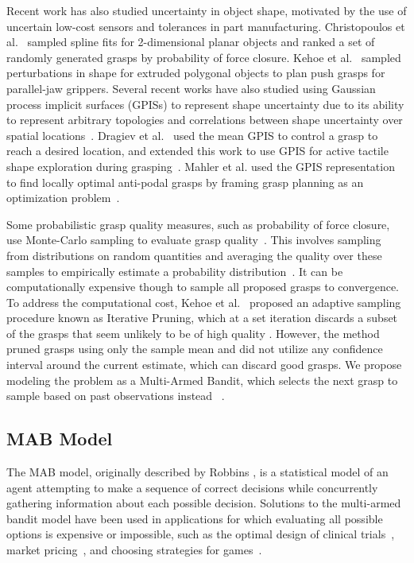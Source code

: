 \documentclass[10pt, conference]{ieeeconf}      %
\begin{document}
Recent work has also studied uncertainty in object shape, motivated by the use of uncertain low-cost sensors and tolerances in part manufacturing.
Christopoulos et al.~\cite{christopoulos2007handling} sampled spline fits for 2-dimensional planar objects and ranked a set of randomly generated grasps by probability of force closure.
Kehoe et al.~\cite{kehoe2012estimating, kehoe2012toward} sampled perturbations in shape for extruded polygonal objects to plan push grasps for parallel-jaw grippers.
Several recent works have also studied using Gaussian process implicit surfaces (GPISs) to represent shape uncertainty due to its ability to represent arbitrary topologies and correlations between shape uncertainty over spatial locations~\cite{dragiev2011, dragiev2013uncertainty, hollinger2013, mahler2015gp}.
Dragiev et al.~\cite{dragiev2011} used the mean GPIS to control a grasp to reach a desired location, and extended this work to use GPIS for active tactile shape exploration during grasping~\cite{dragiev2013uncertainty}.
Mahler et al. used the GPIS representation to find locally optimal anti-podal grasps by framing grasp planning as an optimization problem~\cite{mahler2015gp}. 




Some probabilistic grasp quality measures, such as probability of force closure, use Monte-Carlo sampling to evaluate grasp quality~\cite{christopoulos2007handling, kehoe2012estimating, kehoe2012toward}.
This involves sampling from distributions on random quantities and averaging the quality over these samples to empirically estimate a probability distribution~\cite{caflisch1998monte}.
It can be computationally expensive though to sample all proposed grasps to convergence.
To address the computational cost, Kehoe et al.~\cite{kehoe2012estimating} proposed an adaptive sampling procedure known as Iterative Pruning, which at a set iteration discards a subset of the grasps that seem unlikely to be of high quality . However, the method pruned grasps using only the sample mean and did not utilize any confidence interval around the current estimate, which can discard good grasps.
We propose modeling the problem as a Multi-Armed Bandit, which selects the next grasp to sample based on past observations instead ~\cite{barto1998reinforcement, lai1985asymptotically}.

\subsection{MAB Model}
The MAB model, originally described by Robbins \cite{robbins1985some}, is a statistical model of an agent attempting to make a sequence of correct decisions while concurrently gathering information about each possible decision. Solutions to the multi-armed bandit model have been used in applications for which evaluating all possible options is expensive or impossible, such as the optimal design of clinical trials~\cite{simon1989optimal}, market pricing~\cite{rothschild1974two}, and choosing strategies for games~\cite{st2012online}. 
\end{document}
